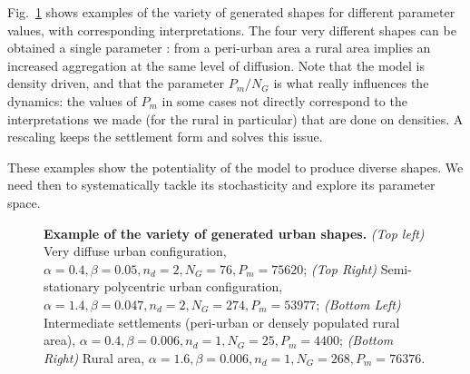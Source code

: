 \documentclass[10pt,letterpaper]{article}
\begin{document}
Fig.~\ref{fig:fig3} shows examples of the variety of generated shapes for different parameter values, with corresponding interpretations. The four very different shapes can be obtained  a single parameter :  from a peri-urban area  a rural area implies an increased aggregation at the same level of diffusion. Note that the model is density driven, and that the parameter $P_m/N_G$ is what really influences the dynamics: the values of $P_m$  in some cases not directly correspond to the interpretations we made (for the rural in particular) that are done on densities. A rescaling keeps the settlement form and solves this issue.



These examples show the potentiality of the model to produce diverse shapes. We need then to systematically tackle its stochasticity and explore its parameter space.



\begin{figure}
\caption{\textbf{Example of the variety of generated urban shapes.} \textit{(Top left)} Very diffuse urban configuration, $\alpha = 0.4,\beta = 0.05, n_d = 2, N_G = 76, P_m = 75620$; \textit{(Top Right)} Semi-stationary polycentric urban configuration, $\alpha = 1.4,\beta = 0.047, n_d = 2, N_G = 274, P_m = 53977$; \textit{(Bottom Left)} Intermediate settlements (peri-urban or densely populated rural area), $\alpha = 0.4,\beta = 0.006, n_d = 1, N_G = 25, P_m = 4400$; \textit{(Bottom Right)} Rural area, $\alpha = 1.6,\beta = 0.006, n_d = 1, N_G = 268, P_m = 76376$. }
\label{fig:fig3}
\end{figure}
\end{document}

